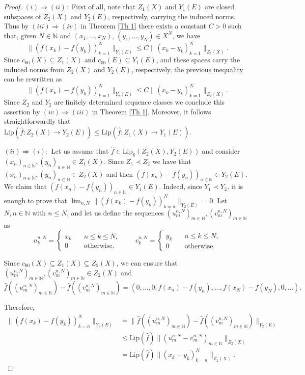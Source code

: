 \documentclass[12pt]{amsart}
\def\N{\mathbb{N}}
\def\Lip{\mathrm{Lip}_0}
\def\Lipnorm{\mathrm{Lip}}
\begin{document}
\begin{proof}
	$(i) \Rightarrow (ii):$ First of all, note that $Z_1(X)$ and $Y_1(E)$ are closed subspaces of $Z_2(X)$ and $Y_2(E)$, respectively, carrying the induced norms. Thus by $(iii) \Rightarrow (iv)$ in Theorem \ref{Th 1} there exists a constant $C>0$ such that, given $N\in\N$ and $(x_1,\ldots,x_N)$, $(y_1,\ldots,y_N) \in X^N$, we have
	$$
	\|(f(x_k)-f(y_k))_{k=1}^N\|_{Y_1(E)} \leq C\|(x_k-y_k)_{k=1}^N\|_{Z_1(X)}.
	$$
	Since $c_{00}(X) \subseteq Z_1(X)$ and $c_{00}(E) \subseteq Y_1(E)$, and these spaces carry the induced norms from $Z_2(X)$ and $Y_2(E)$, respectively, the previous inequality can be rewritten as
	$$
	\|(f(x_k)-f(y_k))_{k=1}^N\|_{Y_2(E)} \leq C\|(x_k-y_k)_{k=1}^N\|_{Z_2(X)}.
	$$
	Since $Z_2$ and $Y_2$ are finitely determined sequence classes we conclude this assertion by $(iv) \Rightarrow (iii)$ in Theorem \ref{Th 1}. Moreover, it follows straightforwardly that $\Lipnorm(\hat{f}:Z_2(X)\to Y_2(E)) \leq \Lipnorm(\hat{f}:Z_1(X)\to Y_1(E))$.

	$(ii) \Rightarrow (i):$ Let us assume that $\hat{f} \in \Lip(Z_2(X),Y_2(E))$ and consider $(x_n)_{n\in\N},(y_n)_{n\in\N} \in Z_1(X)$. Since $Z_1 \prec Z_2$ we have that $(x_n)_{n\in\N},(y_n)_{n\in\N} \in Z_2(X)$ and then $(f(x_n)-f(y_n))_{n\in\N} \in Y_2(E)$. We claim that $(f(x_n)-f(y_n))_{n\in\N} \in Y_1(E)$. Indeed, since $Y_1 \prec Y_2$, it is enough to prove that $\lim_{n,N}\|(f(x_k)-f(y_k))_{k=n}^N\|_{Y_2(E)}=0$. Let $N,n\in\N$ with $n\leq N$, and let us define the sequences $(u_m^{n,N})_{m\in\N},(v_m^{n,N})_{m\in\N}$ as
	$$
	u_k^{n,N} = \begin{cases}
		x_k \quad &n \leq k \leq N,\\
		0 \quad &\text{otherwise}.
	\end{cases} \qquad
	v_k^{n,N} = \begin{cases}
		y_k \quad &n\leq k \leq N,\\
		0 \quad &\text{otherwise}.
	\end{cases}
	$$

	Since $c_{00}(X) \subseteq Z_1(X) \subseteq Z_2(X)$, we can ensure that $(u_m^{n,N})_{m\in\N},(v_m^{n,N})_{m\in\N} \in Z_2(X)$ and
	$$
	\hat{f}((u_m^{n,N})_{m\in\N})-\hat{f}((v_m^{n,N})_{m\in\N}) = (0, \ldots, 0, f(x_n)-f(y_n), \ldots, f(x_N)-f(y_N), 0, \ldots).
	$$

	Therefore,
	\begin{align*}
		\|(f(x_k)-f(y_k))_{k=n}^N\|_{Y_2(E)} &= \|\hat{f}((u_m^{n,N})_{m\in\N})-\hat{f}((v_m^{n,N})_{m\in\N})\|_{Y_2(E)}\\
		&\leq \Lipnorm(\hat{f})\|(u_m^{n,N}-v_m^{n,N})_{m\in\N}\|_{Z_2(X)}\\ 
		&= \Lipnorm(\hat{f})\|(x_k-y_k)_{k=n}^N\|_{Z_2(X)}.
	\end{align*}


\end{proof}
\end{document}
